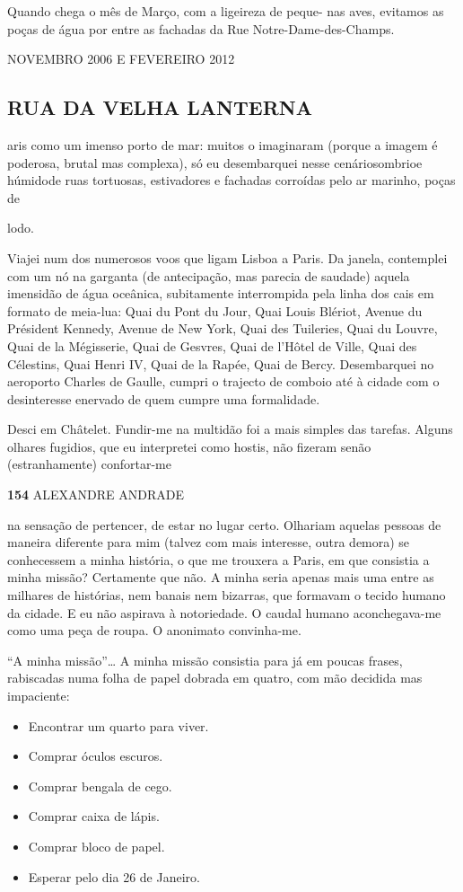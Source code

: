 Quando chega o mês de Março, com a ligeireza de peque- nas aves,
evitamos as poças de água por entre as fachadas da Rue
Notre-Dame-des-Champs.

NOVEMBRO 2006 E FEVEREIRO 2012

\subsection{RUA DA VELHA LANTERNA}

aris como um imenso porto de mar: muitos o imaginaram (porque a imagem é
poderosa, brutal mas complexa), só eu desembarquei nesse cenáriosombrioe
húmidode ruas tortuosas, estivadores e fachadas corroídas pelo ar
marinho, poças de

lodo.

Viajei num dos numerosos voos que ligam Lisboa a Paris. Da janela,
contemplei com um nó na garganta (de antecipação, mas parecia de
saudade) aquela imensidão de água oceânica, subitamente interrompida
pela linha dos cais em formato de meia-lua: Quai du Pont du Jour, Quai
Louis Blériot, Avenue du Président Kennedy, Avenue de New York, Quai des
Tuileries, Quai du Louvre, Quai de la Mégisserie, Quai de Gesvres, Quai
de l'Hôtel de Ville, Quai des Célestins, Quai Henri IV, Quai de la
Rapée, Quai de Bercy. Desembarquei no aeroporto Charles de Gaulle,
cumpri o trajecto de comboio até à cidade com o desinteresse enervado de
quem cumpre uma formalidade.

Desci em Châtelet. Fundir-me na multidão foi a mais simples das tarefas.
Alguns olhares fugidios, que eu interpretei como hostis, não fizeram
senão (estranhamente) confortar-me

\textbf{154 }ALEXANDRE ANDRADE

na sensação de pertencer, de estar no lugar certo. Olhariam aquelas
pessoas de maneira diferente para mim (talvez com mais interesse, outra
demora) se conhecessem a minha história, o que me trouxera a Paris, em
que consistia a minha missão? Certamente que não. A minha seria apenas
mais uma entre as milhares de histórias, nem banais nem bizarras, que
formavam o tecido humano da cidade. E eu não aspirava à notoriedade. O
caudal humano aconchegava-me como uma peça de roupa. O anonimato
convinha-me.

``A minha missão''\ldots{} A minha missão consistia para já em poucas
frases, rabiscadas numa folha de papel dobrada em quatro, com mão
decidida mas impaciente:

\begin{itemize}
\tightlist
\item
  Encontrar um quarto para viver.
\item
  Comprar óculos escuros.
\item
  Comprar bengala de cego.
\item
  Comprar caixa de lápis.
\item
  Comprar bloco de papel.
\item
  Esperar pelo dia 26 de Janeiro.
\end{itemize}

